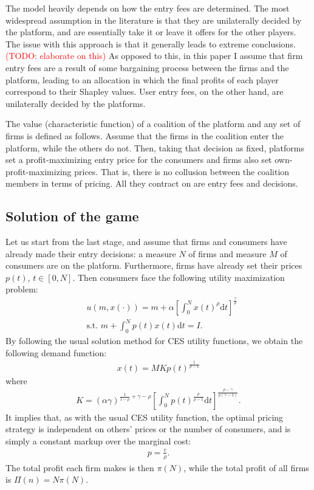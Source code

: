 \documentclass[a4paper]{article}
\newcommand{\dt}{\mathrm{d}t}
\begin{document}
The model heavily depends on how the entry fees are determined. The most widespread assumption in the literature is that they are unilaterally decided by the platform, and are essentially take it or leave it offers for the other players. The issue with this approach is that it generally leads to extreme conclusions. \textcolor{red}{(TODO: elaborate on this)} As opposed to this, in this paper I assume that firm entry fees are a result of some bargaining process between the firms and the platform, leading to an allocation in which the final profits of each player correspond to their Shapley values. User entry fees, on the other hand, are unilaterally decided by the platforms.

The value (characteristic function) of a coalition of the platform and any set of firms is defined as follows. Assume that the firms in the coalition enter the platform, while the others do not. Then, taking that decision as fixed, platforms set a profit-maximizing entry price for the consumers and firms also set own-profit-maximizing prices. That is, there is no collusion between the coalition members in terms of pricing. All they contract on are entry fees and decisions.

\subsection{Solution of the game}

Let us start from the last stage, and assume that firms and consumers have already made their entry decisions: a measure $N$ of firms and measure $M$ of consumers are on the platform. Furthermore, firms have already set their prices $p(t)$, $t \in [0, N]$. Then consumers face the following utility maximization problem:
\begin{align*}
    &u(m, x(\cdot)) = m + \alpha \left[ \int_0^N x(t)^\rho \dt \right] ^ \frac{\gamma}{\rho} \\
    &\text{s.t. } m + \int_0^N p(t) x(t) \dt = I.
\end{align*}
By following the usual solution method for CES utility functions, we obtain the following demand function:
\begin{align*}
    x(t) = M K p(t) ^ \frac{1}{\rho-1}
\end{align*}
where
\begin{align*}
    K = (\alpha \gamma) ^ {\frac{1}{1 - \rho} + \gamma - \rho} \left[ \int_0^N p(t) ^ \frac{\rho}{\rho - 1} \dt \right] ^ \frac{\rho - \gamma}{\rho (\gamma - 1)}.
\end{align*}
It implies that, as with the usual CES utility function, the optimal pricing strategy is independent on others' prices or the number of consumers, and is simply a constant markup over the marginal cost:
\begin{align*}
    p = \frac{c}{\rho}.
\end{align*}
The total profit each firm makes is then $\pi(N)$, while the total profit of all firms is $\Pi(n) = N\pi(N)$.
\end{document}

